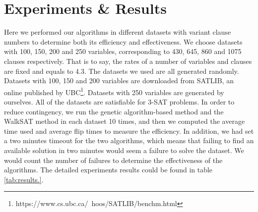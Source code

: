 
\section{Experiments \& Results}

Here we performed our algorithms in different datasets with variant clause numbers to determine both its efficiency and effectiveness. We choose datasets with 100, 150, 200 and 250 variables, corresponding to 430, 645, 860 and 1075 clauses respectively. That is to say, the rates of a number of variables and clauses are fixed and equals to 4.3. The datasets we used are all generated randomly. Datasets with 100, 150 and 200 variables are downloaded from SATLIB, an online published by UBC\footnote{https://www.cs.ubc.ca/~hoos/SATLIB/benchm.html}. Datasets with 250 variables are generated by ourselves. All of the datasets are satisfiable for 3-SAT problems. In order to reduce contingency, we run the genetic algorithm-based method and the WalkSAT method in each dataset 10 times, and then we computed the average time used and average flip times to measure the efficiency. In addition, we had set a two minutes timeout for the two algorithms, which means that failing to find an available solution in two minutes would seem a failure to solve the dataset. We would count the number of failures to determine the effectiveness of the algorithms. The detailed experiments results could be found in table \ref{tab:results.}.
\newpage

